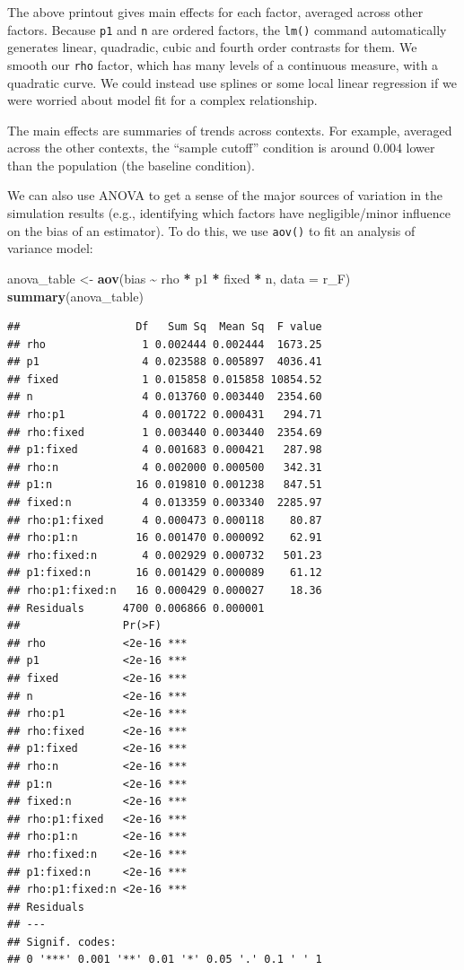\documentclass[
]{book}
\newenvironment{Shaded}{\begin{snugshade}}{\end{snugshade}}
\newcommand{\AttributeTok}[1]{\textcolor[rgb]{0.13,0.29,0.53}{#1}}
\newcommand{\FunctionTok}[1]{\textcolor[rgb]{0.13,0.29,0.53}{\textbf{#1}}}
\newcommand{\NormalTok}[1]{#1}
\newcommand{\OtherTok}[1]{\textcolor[rgb]{0.56,0.35,0.01}{#1}}
\newcommand{\SpecialCharTok}[1]{\textcolor[rgb]{0.81,0.36,0.00}{\textbf{#1}}}
\begin{document}
The above printout gives main effects for each factor, averaged across other factors.
Because \texttt{p1} and \texttt{n} are ordered factors, the \texttt{lm()} command automatically generates linear, quadradic, cubic and fourth order contrasts for them.
We smooth our \texttt{rho} factor, which has many levels of a continuous measure, with a quadratic curve.
We could instead use splines or some local linear regression if we were worried about model fit for a complex relationship.

The main effects are summaries of trends across contexts.
For example, averaged across the other contexts, the ``sample cutoff'' condition is around 0.004 lower than the population (the baseline condition).

We can also use ANOVA to get a sense of the major sources of variation in the simulation results (e.g., identifying which factors have negligible/minor influence on the bias of an estimator).
To do this, we use \texttt{aov()} to fit an analysis of variance model:

\begin{Shaded}
\begin{Highlighting}[]
\NormalTok{anova\_table }\OtherTok{\textless{}{-}} \FunctionTok{aov}\NormalTok{(bias }\SpecialCharTok{\textasciitilde{}}\NormalTok{ rho }\SpecialCharTok{*}\NormalTok{ p1 }\SpecialCharTok{*}\NormalTok{ fixed }\SpecialCharTok{*}\NormalTok{ n, }\AttributeTok{data =}\NormalTok{ r\_F)}
\FunctionTok{summary}\NormalTok{(anova\_table)}
\end{Highlighting}
\end{Shaded}

\begin{verbatim}
##                  Df   Sum Sq  Mean Sq  F value
## rho               1 0.002444 0.002444  1673.25
## p1                4 0.023588 0.005897  4036.41
## fixed             1 0.015858 0.015858 10854.52
## n                 4 0.013760 0.003440  2354.60
## rho:p1            4 0.001722 0.000431   294.71
## rho:fixed         1 0.003440 0.003440  2354.69
## p1:fixed          4 0.001683 0.000421   287.98
## rho:n             4 0.002000 0.000500   342.31
## p1:n             16 0.019810 0.001238   847.51
## fixed:n           4 0.013359 0.003340  2285.97
## rho:p1:fixed      4 0.000473 0.000118    80.87
## rho:p1:n         16 0.001470 0.000092    62.91
## rho:fixed:n       4 0.002929 0.000732   501.23
## p1:fixed:n       16 0.001429 0.000089    61.12
## rho:p1:fixed:n   16 0.000429 0.000027    18.36
## Residuals      4700 0.006866 0.000001         
##                Pr(>F)    
## rho            <2e-16 ***
## p1             <2e-16 ***
## fixed          <2e-16 ***
## n              <2e-16 ***
## rho:p1         <2e-16 ***
## rho:fixed      <2e-16 ***
## p1:fixed       <2e-16 ***
## rho:n          <2e-16 ***
## p1:n           <2e-16 ***
## fixed:n        <2e-16 ***
## rho:p1:fixed   <2e-16 ***
## rho:p1:n       <2e-16 ***
## rho:fixed:n    <2e-16 ***
## p1:fixed:n     <2e-16 ***
## rho:p1:fixed:n <2e-16 ***
## Residuals                
## ---
## Signif. codes:  
## 0 '***' 0.001 '**' 0.01 '*' 0.05 '.' 0.1 ' ' 1
\end{verbatim}
\end{document}
